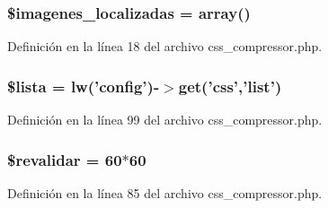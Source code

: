 \hypertarget{css__compressor_8php_a78324224a8b7bd09b0fad9bd556122df}{
\subsubsection[{\$imagenes\-\_\-localizadas}]{\setlength{\rightskip}{0pt plus 5cm}\$imagenes\-\_\-localizadas = array()}}\label{css__compressor_8php_a78324224a8b7bd09b0fad9bd556122df}


Definición en la línea 18 del archivo css\-\_\-compressor.\-php.

\hypertarget{css__compressor_8php_ac40c8d54c9efc86d64e63bcc60447734}{
\subsubsection[{\$lista}]{\setlength{\rightskip}{0pt plus 5cm}\$lista = {\bf lw}('{\bf config}')-\/$>${\bf get}('css','list')}}\label{css__compressor_8php_ac40c8d54c9efc86d64e63bcc60447734}


Definición en la línea 99 del archivo css\-\_\-compressor.\-php.

\hypertarget{css__compressor_8php_aea9b3a9631ff4b34c48b0298669718d0}{
\subsubsection[{\$revalidar}]{\setlength{\rightskip}{0pt plus 5cm}\$revalidar = 60$\ast$60}}\label{css__compressor_8php_aea9b3a9631ff4b34c48b0298669718d0}


Definición en la línea 85 del archivo css\-\_\-compressor.\-php.

